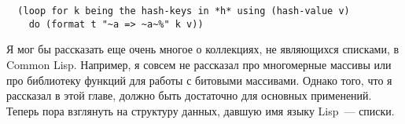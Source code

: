 \begin{lstlisting}  
  (loop for k being the hash-keys in *h* using (hash-value v)
    do (format t "~a => ~a~%" k v))
\end{lstlisting}

Я мог бы рассказать еще очень многое о коллекциях, не являющихся списками, в Common
Lisp.  Например, я совсем не рассказал про многомерные массивы или про библиотеку функций
для работы с битовыми массивами.  Однако того, что я рассказал в этой главе, должно быть
достаточно для основных применений.  Теперь пора взглянуть на
структуру данных, давшую имя языку Lisp~--- списки.

